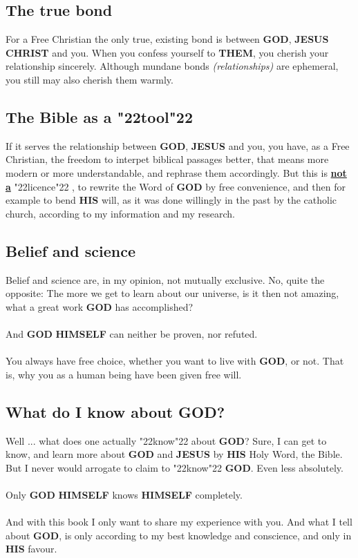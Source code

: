 \documentclass[12pt,a5paper]{article}
\newcommand{\Christ}[0]{\textbf{CHRIST}}
\newcommand{\God}[0]{\textbf{GOD}}
\newcommand{\Himself}[0]{\textbf{HIMSELF}}
\newcommand{\His}[0]{\textbf{HIS}}
\newcommand{\Jesus}[0]{\textbf{JESUS}}
\newcommand{\Them}[0]{\textbf{THEM}}
\newcommand{\q}[1]{\char"22{#1}\char"22 }
\begin{document}
	\subsection{The true bond}
		For a Free Christian the only true,
		existing bond is between {\God},
		{\Jesus} {\Christ} and you.
		When you confess yourself to {\Them},
		you cherish your relationship sincerely.
		Although mundane bonds \textit{(relationships)} are ephemeral,
		you still may also cherish them warmly.
			
	\subsection{The Bible as a \q{tool}}
		If it serves the relationship between {\God},
		{\Jesus} and you,
		you have,
		as a Free Christian,
		the freedom to interpet biblical passages better,
		that means more modern or more understandable,
		and rephrase them accordingly.
		But this is \textbf{\underline{not a}} \q{licence},
		to rewrite the Word of {\God} by free convenience,
		and then for example to bend {\His} will,
		as it was done willingly in the past by the catholic church,
		according to my information and my research.
		
	\subsection{Belief and science}
		Belief and science are,
		in my opinion,
		not mutually exclusive.
		No,
		quite the opposite:
		The more we get to learn about our universe,
		is it then not amazing,
		what a great work {\God} has accomplished?
		\\
		\\
		And {\God} {\Himself} can neither be proven,
		nor refuted.
		\\
		\\
		You always have free choice,
		whether you want to live with {\God},
		or not.
		That is,
		why you as a human being have been given free will.

	\subsection{What do I know about {\God}?}
		Well ... what does one actually \q{know} about {\God}?
		Sure,
		I can get to know,
		and learn more about {\God} and {\Jesus} by {\His} Holy Word,
		the Bible.
		But I never would arrogate to claim to \q{know} {\God}.
		Even less absolutely.
		\\
		\\
		Only {\God} {\Himself} knows {\Himself} completely.
		\\
		\\
		And with this book I only want to share my experience with you.
		And what I tell about {\God},
		is only according to my best knowledge and conscience,
		and only in {\His} favour.
		
\end{document}
